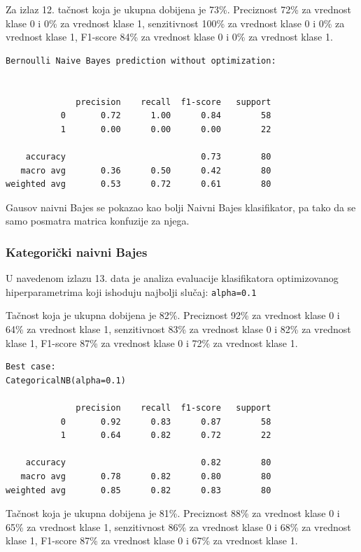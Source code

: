 \documentclass[fontsize=12bp, paper=a4]{scrarticle}
\begin{document}
Za izlaz 12. tačnost koja je ukupna dobijena je 73\%. Preciznost 72\% za vrednost klase 0 i 0\% za vrednost klase 1, senzitivnost 100\% za vrednost klase 0 i 0\% za vrednost klase 1, F1-score 84\% za vrednost klase 0 i 0\% za vrednost klase 1.

\begin{lstlisting}[caption=Bernuli naivni Bajes bez optimizacija hiperparametara]
Bernoulli Naive Bayes prediction without optimization:


              precision    recall  f1-score   support
           0       0.72      1.00      0.84        58
           1       0.00      0.00      0.00        22

    accuracy                           0.73        80
   macro avg       0.36      0.50      0.42        80
weighted avg       0.53      0.72      0.61        80
\end{lstlisting}

Gausov naivni Bajes se pokazao kao bolji Naivni Bajes klasifikator, pa tako da se samo posmatra matrica konfuzije za njega.

\subsubsection{Kategorički naivni Bajes}

U navedenom izlazu 13. data je analiza evaluacije klasifikatora 
 optimizovanog hiperparametrima koji ishoduju najbolji slučaj: \verb|alpha=0.1|
 
 Tačnost koja je ukupna dobijena je 82\%. Preciznost 92\% za vrednost klase 0 i 64\% za vrednost klase 1, senzitivnost 83\% za vrednost klase 0 i 82\% za vrednost klase 1, F1-score 87\% za vrednost klase 0 i 72\% za vrednost klase 1.

\begin{lstlisting}[caption=Kategorički naivni Bajes sa optimizacijom hiperparametara]
Best case:
CategoricalNB(alpha=0.1)

              precision    recall  f1-score   support
           0       0.92      0.83      0.87        58
           1       0.64      0.82      0.72        22

    accuracy                           0.82        80
   macro avg       0.78      0.82      0.80        80
weighted avg       0.85      0.82      0.83        80
\end{lstlisting}

Tačnost koja je ukupna dobijena je 81\%. Preciznost 88\% za vrednost klase 0 i 65\% za vrednost klase 1, senzitivnost 86\% za vrednost klase 0 i 68\% za vrednost klase 1, F1-score 87\% za vrednost klase 0 i 67\% za vrednost klase 1.
 
\end{document}
